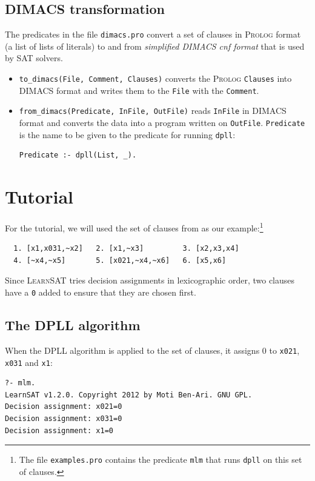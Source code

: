 \documentclass[11pt]{report}
\newcommand*{\p}[1]{\textup{\texttt{#1}}}
\newcommand*{\ls}{\textsc{LearnSAT}}
\newcommand*{\pl}{\textsc{Prolog}}
\begin{document}
\section{DIMACS transformation}

The predicates in the file \p{dimacs.pro} convert a set of clauses in
\pl{} format (a list of lists of literals) to and from \emph{simplified
DIMACS cnf format} that is used by SAT solvers.
\begin{itemize}
\item \p{to\_dimacs(File, Comment, Clauses)} converts the \pl{}
\p{Clauses} into DIMACS format and writes them to the \p{File} with the
\p{Comment}.
\item \p{from\_dimacs(Predicate, InFile, OutFile)} reads \p{InFile} in
DIMACS format and converts the data into a program written on
\p{OutFile}. \p{Predicate} is the name to be given to the predicate for
running \p{dpll}:
\begin{verbatim}
Predicate :- dpll(List, _).
\end{verbatim}
\end{itemize}




\chapter{Tutorial}

For the tutorial, we will used the set of clauses from \cite{mlm} as our
example:\footnote{The file \p{examples.pro} contains the predicate
\p{mlm} that runs \p{dpll} on this set of clauses.}

\begin{verbatim}
  1. [x1,x031,~x2]   2. [x1,~x3]         3. [x2,x3,x4]
  4. [~x4,~x5]       5. [x021,~x4,~x6]   6. [x5,x6]
\end{verbatim}

Since \ls{} tries decision assignments in lexicographic order, two
clauses have a \p{0} added to ensure that they are chosen first.

\section{The DPLL algorithm}

When the DPLL algorithm is applied to the set of clauses, it assigns
0 to \p{x021}, \p{x031} and \p{x1}:

\begin{verbatim}
?- mlm.
LearnSAT v1.2.0. Copyright 2012 by Moti Ben-Ari. GNU GPL.
Decision assignment: x021=0
Decision assignment: x031=0
Decision assignment: x1=0
\end{verbatim}
\end{document}
